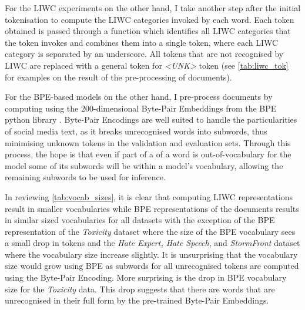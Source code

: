 For the LIWC experiments on the other hand, I take another step after the initial tokenisation to compute the LIWC categories invoked by each word. Each token obtained is passed through a function which identifies all LIWC categories that the token invokes and combines them into a single token, where each LIWC category is separated by an underscore. All tokens that are not recognised by LIWC are replaced with a general token for \textit{<UNK>} token (see \cref{tab:liwc_tok} for examples on the result of the pre-processing of documents).

For the BPE-based models on the other hand, I pre-process documents by computing using the 200-dimensional Byte-Pair Embeddings from the BPE python library \citep{Heinzerling:2018}. Byte-Pair Encodings are well suited to handle the particularities of social media text, as it breaks unrecognised words into subwords, thus minimising unknown tokens in the validation and evaluation sets. Through this process, the hope is that even if part of a of a word is out-of-vocabulary for the model some of its subwords will be within a model's vocabulary, allowing the remaining subwords to be used for inference.

\begin{table}
  \centering
  \caption{Word token and BPE representation.}
  \label{tab:bpe_tok}
\end{table}

In reviewing \cref{tab:vocab_sizes}, it is clear that computing LIWC representations result in smaller vocabularies while BPE representations of the documents results in similar sized vocabularies for all datasets with the exception of the BPE representation of the \textit{Toxicity} dataset where the size of the BPE vocabulary sees a small drop in tokens and the \textit{Hate Expert, Hate Speech}, and \textit{StormFront} dataset where the vocabulary size increase slightly. It is unsurprising that the vocabulary size would grow using BPE as subwords for all unrecognised tokens are computed using the Byte-Pair Encoding. More surprising is the drop in BPE vocabulary size for the \textit{Toxicity} data. This drop suggests that there are words that are unrecognised in their full form by the pre-trained Byte-Pair Embeddings.

